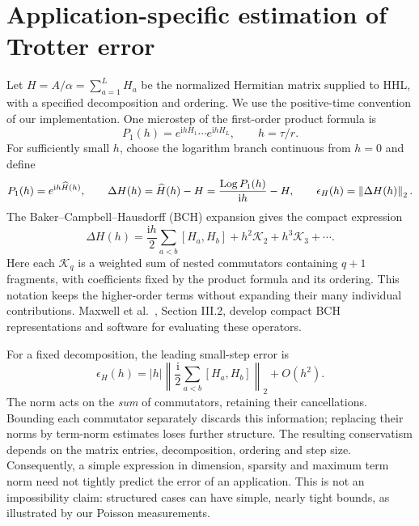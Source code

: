 \section{Application-specific estimation of Trotter error}
Let $H=A/\alpha=\sum_{a=1}^{L}H_a$ be the normalized Hermitian matrix supplied to HHL, with a specified decomposition and ordering. We use the positive-time convention of our implementation. One microstep of the first-order product formula is
\begin{equation}
 P_1(h)=e^{\mathrm{i}hH_1}\cdots e^{\mathrm{i}hH_L},\qquad h=\tau/r.
\end{equation}
For sufficiently small $h$, choose the logarithm branch continuous from $h=0$ and define
\begin{equation}\label{eq:effective}
 P_1(h)=e^{\mathrm{i}h\widehat H(h)},\qquad
 \Delta H(h)=\widehat H(h)-H
 =\frac{\operatorname{Log}P_1(h)}{\mathrm{i}h}-H,\qquad
 \epsilon_H(h)=\left\lVert \Delta H(h)\right\rVert_2.
\end{equation}
The Baker--Campbell--Hausdorff (BCH) expansion gives the compact expression
\begin{equation}\label{eq:bch}
 \boxed{\Delta H(h)=\frac{\mathrm{i}h}{2}\sum_{a<b}[H_a,H_b]
       +h^2\mathcal K_2+h^3\mathcal K_3+\cdots.}
\end{equation}
Here each $\mathcal K_q$ is a weighted sum of nested commutators containing $q+1$ fragments, with coefficients fixed by the product formula and its ordering. This notation keeps the higher-order terms without expanding their many individual contributions. Maxwell et al.~\cite{maxwell}, Section III.2, develop compact BCH representations and software for evaluating these operators.

For a fixed decomposition, the leading small-step error is
\begin{equation}\label{eq:leading}
 \epsilon_H(h)=|h|\left\lVert\frac{\mathrm{i}}2
             \sum_{a<b}[H_a,H_b]\right\rVert_2+O(h^2).
\end{equation}
The norm acts on the \emph{sum} of commutators, retaining their cancellations. Bounding each commutator separately discards this information; replacing their norms by term-norm estimates loses further structure. The resulting conservatism depends on the matrix entries, decomposition, ordering and step size. Consequently, a simple expression in dimension, sparsity and maximum term norm need not tightly predict the error of an application. This is not an impossibility claim: structured cases can have simple, nearly tight bounds, as illustrated by our Poisson measurements.

